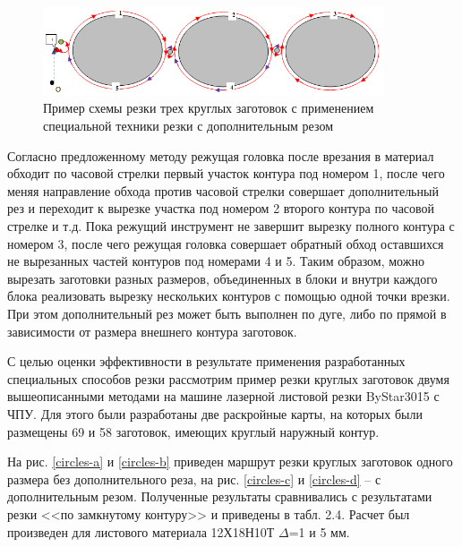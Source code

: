 \documentclass[11pt,twoside]{report}
\begin{document}
\begin{figure}
  \begin{center}
  \includegraphics[width=0.9\textwidth]{3-extra.png}
  \caption{Пример схемы резки трех круглых заготовок с применением специальной техники резки с дополнительным резом}
  \label{3-extra}
  \end{center}
\end{figure}

Согласно предложенному методу режущая головка
после врезания в материал обходит по часовой
стрелки первый участок контура под номером 1,
после чего меняя направление обхода против
часовой стрелки совершает дополнительный рез и
переходит к вырезке участка под номером 2 второго
контура по часовой стрелке и т.д.
Пока режущий инструмент не завершит
вырезку полного контура с номером 3,
после чего режущая головка совершает обратный обход
оставшихся не вырезанных частей контуров под номерами 4 и 5.
Таким образом, можно вырезать заготовки разных размеров,
объединенных в блоки и внутри каждого блока реализовать
вырезку нескольких контуров с помощью одной точки врезки.
При этом дополнительный рез может быть выполнен по дуге,
либо по прямой в зависимости от размера внешнего контура заготовок.

С целью оценки эффективности в результате применения
разработанных специальных способов резки рассмотрим
пример резки круглых заготовок двумя вышеописанными
методами на машине лазерной листовой резки ByStar3015 с ЧПУ.
Для этого были разработаны две раскройные карты,
на которых были размещены 69 и 58 заготовок,
имеющих круглый наружный контур.

На рис. \ref{circles-a} и \ref{circles-b}
приведен маршрут резки
круглых заготовок одного размера без дополнительного реза,
на рис. \ref{circles-c} и \ref{circles-d} – с дополнительным резом.
Полученные результаты сравнивались с результатами
резки <<по замкнутому контуру>> и приведены в табл. 2.4.
Расчет был произведен для листового материала 12Х18Н10Т $\Delta$=1 и 5 мм.
\end{document}
